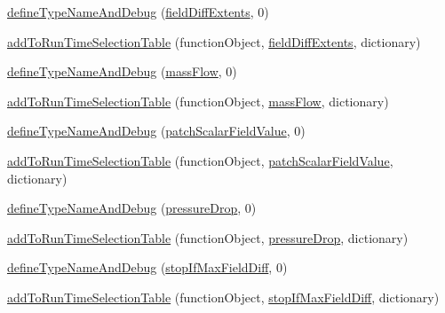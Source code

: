 \begin{DoxyCompactItemize}
\item 
\hyperlink{namespaceFoam_1_1functionObjects_a2433b4c0711ea7e43bf24cc30445a30b}{define\+Type\+Name\+And\+Debug} (\hyperlink{classFoam_1_1functionObjects_1_1fieldDiffExtents}{field\+Diff\+Extents}, 0)
\item 
\hyperlink{namespaceFoam_1_1functionObjects_a6e8f5e9107d89e2de318a55e883c03b2}{add\+To\+Run\+Time\+Selection\+Table} (function\+Object, \hyperlink{classFoam_1_1functionObjects_1_1fieldDiffExtents}{field\+Diff\+Extents}, dictionary)
\item 
\hyperlink{namespaceFoam_1_1functionObjects_a6e812834d61eb717b6e5cf20b4d03220}{define\+Type\+Name\+And\+Debug} (\hyperlink{classFoam_1_1functionObjects_1_1massFlow}{mass\+Flow}, 0)
\item 
\hyperlink{namespaceFoam_1_1functionObjects_a9eded8c4b72653305130b42a441bdd27}{add\+To\+Run\+Time\+Selection\+Table} (function\+Object, \hyperlink{classFoam_1_1functionObjects_1_1massFlow}{mass\+Flow}, dictionary)
\item 
\hyperlink{namespaceFoam_1_1functionObjects_a7546d07aca46a68ca34482fa6f47ffcc}{define\+Type\+Name\+And\+Debug} (\hyperlink{classFoam_1_1functionObjects_1_1patchScalarFieldValue}{patch\+Scalar\+Field\+Value}, 0)
\item 
\hyperlink{namespaceFoam_1_1functionObjects_a28017dcbb9893f088b30015d7b33e0ba}{add\+To\+Run\+Time\+Selection\+Table} (function\+Object, \hyperlink{classFoam_1_1functionObjects_1_1patchScalarFieldValue}{patch\+Scalar\+Field\+Value}, dictionary)
\item 
\hyperlink{namespaceFoam_1_1functionObjects_a384af47ac4b4adc660a04c145fd9ebbe}{define\+Type\+Name\+And\+Debug} (\hyperlink{classFoam_1_1functionObjects_1_1pressureDrop}{pressure\+Drop}, 0)
\item 
\hyperlink{namespaceFoam_1_1functionObjects_ac568caf0078355ff15dd7d6718a7e21a}{add\+To\+Run\+Time\+Selection\+Table} (function\+Object, \hyperlink{classFoam_1_1functionObjects_1_1pressureDrop}{pressure\+Drop}, dictionary)
\item 
\hyperlink{namespaceFoam_1_1functionObjects_abbfc611f41fd8e5b26342814315ac604}{define\+Type\+Name\+And\+Debug} (\hyperlink{classFoam_1_1functionObjects_1_1stopIfMaxFieldDiff}{stop\+If\+Max\+Field\+Diff}, 0)
\item 
\hyperlink{namespaceFoam_1_1functionObjects_a01929853a60a374a0d92e7492cd44f34}{add\+To\+Run\+Time\+Selection\+Table} (function\+Object, \hyperlink{classFoam_1_1functionObjects_1_1stopIfMaxFieldDiff}{stop\+If\+Max\+Field\+Diff}, dictionary)

\end{DoxyCompactItemize}
